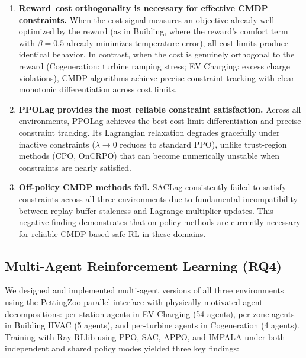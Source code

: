 \begin{enumerate}
    \item \textbf{Reward--cost orthogonality is necessary for effective CMDP constraints.} When the cost signal measures an objective already well-optimized by the reward (as in Building, where the reward's comfort term with $\beta = 0.5$ already minimizes temperature error), all cost limits produce identical behavior. In contrast, when the cost is genuinely orthogonal to the reward (Cogeneration: turbine ramping stress; EV Charging: excess charge violations), CMDP algorithms achieve precise constraint tracking with clear monotonic differentiation across cost limits.

    \item \textbf{PPOLag provides the most reliable constraint satisfaction.} Across all environments, PPOLag achieves the best cost limit differentiation and precise constraint tracking. Its Lagrangian relaxation degrades gracefully under inactive constraints ($\lambda \to 0$ reduces to standard PPO), unlike trust-region methods (CPO, OnCRPO) that can become numerically unstable when constraints are nearly satisfied.

    \item \textbf{Off-policy CMDP methods fail.} SACLag consistently failed to satisfy constraints across all three environments due to fundamental incompatibility between replay buffer staleness and Lagrange multiplier updates. This negative finding demonstrates that on-policy methods are currently necessary for reliable CMDP-based safe RL in these domains.
\end{enumerate}

\subsection{Multi-Agent Reinforcement Learning (RQ4)}

We designed and implemented multi-agent versions of all three environments using the PettingZoo parallel interface with physically motivated agent decompositions: per-station agents in EV Charging (54 agents), per-zone agents in Building HVAC (5 agents), and per-turbine agents in Cogeneration (4 agents). Training with Ray RLlib using PPO, SAC, APPO, and IMPALA under both independent and shared policy modes yielded three key findings:

